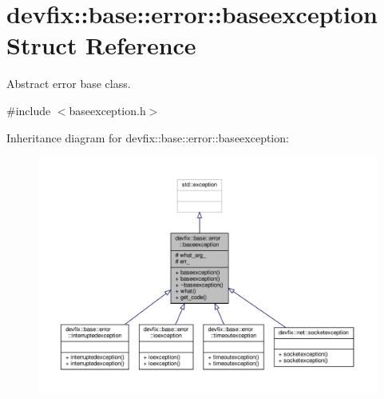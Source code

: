 \hypertarget{structdevfix_1_1base_1_1error_1_1baseexception}{}\section{devfix\+:\+:base\+:\+:error\+:\+:baseexception Struct Reference}
\label{structdevfix_1_1base_1_1error_1_1baseexception}


Abstract error base class.  




{\ttfamily \#include $<$baseexception.\+h$>$}



Inheritance diagram for devfix\+:\+:base\+:\+:error\+:\+:baseexception\+:\nopagebreak
\begin{figure}[H]
\begin{center}
\leavevmode
\includegraphics[width=350pt]{structdevfix_1_1base_1_1error_1_1baseexception__inherit__graph}
\end{center}
\end{figure}
